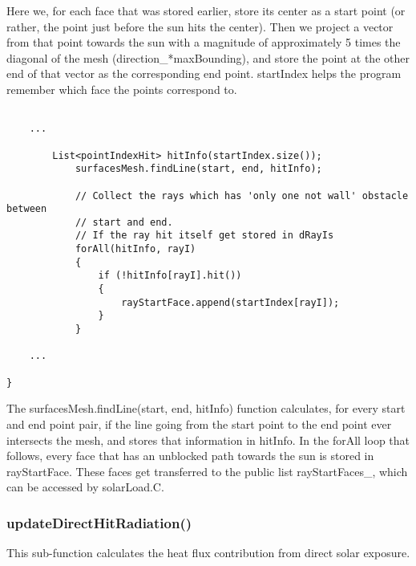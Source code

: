 Here we, for each face that was stored earlier, store its center as a start point (or rather, the point just before the sun hits the center). Then we project a vector from that point towards the sun with a magnitude of approximately 5 times the diagonal of the mesh (direction\_*maxBounding), and store the point at the other end of that vector as the corresponding end point. startIndex helps the program remember which face the points correspond to.

\begin{verbatim}

    ...
    
        List<pointIndexHit> hitInfo(startIndex.size());
            surfacesMesh.findLine(start, end, hitInfo);
    
            // Collect the rays which has 'only one not wall' obstacle between
            // start and end.
            // If the ray hit itself get stored in dRayIs
            forAll(hitInfo, rayI)
            {
                if (!hitInfo[rayI].hit())
                {
                    rayStartFace.append(startIndex[rayI]);
                }
            }
            
    ...

}
\end{verbatim}

The surfacesMesh.findLine(start, end, hitInfo) function calculates, for every start and end point pair, if the line going from the start point to the end point ever intersects the mesh, and stores that information in hitInfo. In the forAll loop that follows, every face that has an unblocked path towards the sun is stored in rayStartFace. These faces get transferred to the public list rayStartFaces\_, which can be accessed by solarLoad.C.

\subsubsection{updateDirectHitRadiation()}

This sub-function calculates the heat flux contribution from direct solar exposure.

